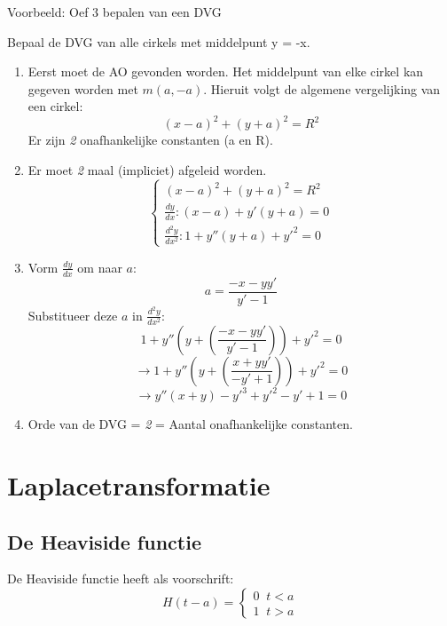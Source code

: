 \documentclass[12pt]{report}
\newcommand{\example}[2]{
    \hrulefill
    
    Voorbeeld: #1
    
    #2
    
    \hrulefill
}
\begin{document}
\example{Oef 3 bepalen van een DVG}
{
Bepaal de DVG van alle cirkels met middelpunt y = -x.
\begin{enumerate}
\item Eerst moet de AO gevonden worden. Het middelpunt van elke cirkel kan gegeven worden met $m(a, -a).$
    Hieruit volgt de algemene vergelijking van een cirkel: $$(x - a)^2 + (y + a)^2 = R^2$$
    Er zijn \textit{2} onafhankelijke constanten (a en R).
\item Er moet \textit{2} maal (impliciet) afgeleid worden.
\[
    \begin{cases}
    (x - a)^2 + (y + a)^2 = R^2 \\
    \frac{dy}{dx} : (x-a) + y'(y+a) = 0 \\
    \frac{d^2y}{dx^2} : 1 + y''(y + a) + y'^2 = 0
    \end{cases}
\]
\item
    Vorm $\frac{dy}{dx}$ om naar $a$:
    $$a = \frac{-x - yy'}{y' - 1}$$
    Substitueer deze $a$ in $\frac{d^2y}{dx^2}$:
    $$1 + y''(y + (\frac{-x - yy'}{y' - 1})) + y'^2 = 0$$
    $$\rightarrow 1 + y''(y + (\frac{x + yy'}{-y' + 1})) + y'^2 = 0$$
    $$\rightarrow y''(x + y) - y'^3 + y'^2 - y' + 1 = 0$$
\item Orde van de DVG = \textit{2}  = Aantal onafhankelijke constanten.
\end{enumerate}
}


\chapter{Laplacetransformatie}
\section{De Heaviside functie}
De Heaviside functie heeft als voorschrift:
$$H(t - a) = 
\begin{cases}
0 \;\; t < a \\
1 \;\; t > a
\end{cases}$$
\end{document}
